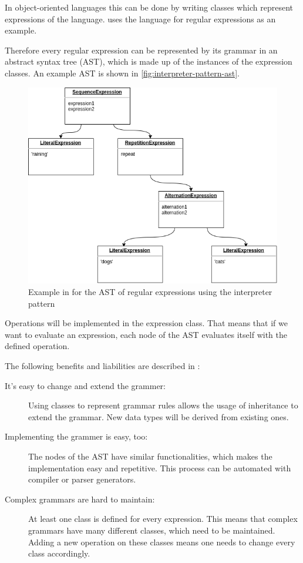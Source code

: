\documentclass{llncs}
\begin{document}
In object-oriented languages this can be done by writing classes which represent expressions of the language. \cite{GHJV94} uses the language for regular expressions as an example.

Therefore every regular expression can be represented by its grammar in an abstract syntax tree (AST), which is made up of the instances of the expression classes. An example AST is shown in \autoref{fig:interpreter-pattern-ast}.

\begin{figure}[h]
	\centering
	\includegraphics[width=\textwidth]{img/Interpreter-Pattern-AST-Example}
	\caption{Example in \cite{GHJV94} for the AST of regular expressions using the interpreter pattern }
	\label{fig:interpreter-pattern-ast}
\end{figure} 

Operations will be implemented in the expression class. That means that if we want to evaluate an expression, each node of the AST evaluates itself with the defined operation.

The following benefits and liabilities are described in \cite{GHJV94}:

\begin{description}
	\item[It's easy to change and extend the grammer:] Using classes to represent grammar rules allows the usage of inheritance to extend the grammar. New data types will be derived from existing ones.
	
	\item[Implementing the grammer is easy, too:] The nodes of the AST have similar functionalities, which makes the implementation easy and repetitive. This process can be automated with compiler or parser generators.
	
	\item[Complex grammars are hard to maintain:] At least one class is defined for every expression. This means that complex grammars have many different classes, which need to be maintained. Adding a new operation on these classes means one needs to change every class accordingly.
\end{description}
\end{document}
